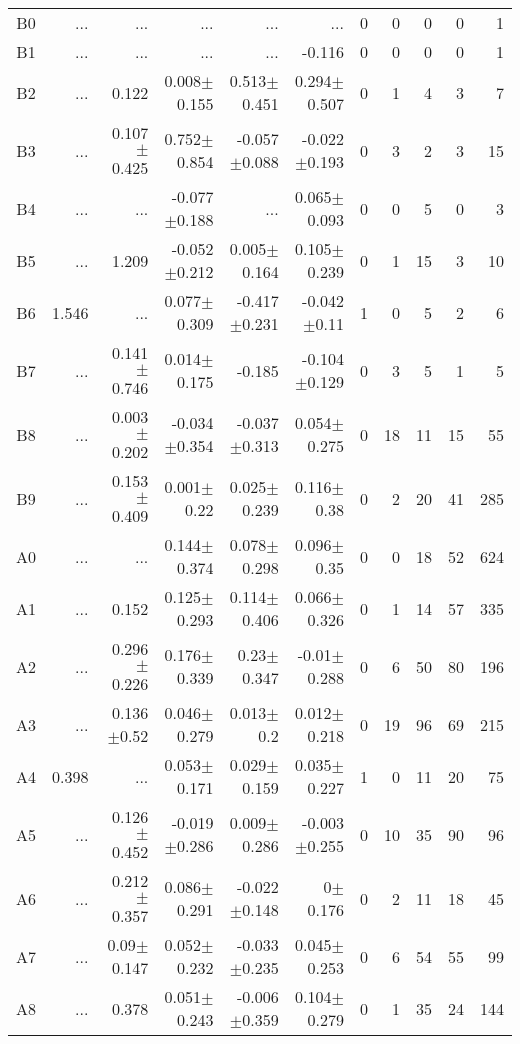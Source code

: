\begin{table}[t]
\begin{table}[t]
\begin{center}
\begin{tabular}{c|rrrrr|rrrrr}
    B0	&	 ...	&	 ...	&	 ...	&	 ...	&	 ...	&	0	&	0	&	0	&	0	&	1	\\
    B1	&	 ...	&	 ...	&	 ...	&	 ...	&	-0.116	&	0	&	0	&	0	&	0	&	1	\\
    B2	&	 ...	&	0.122	&	0.008$\pm$0.155	&	0.513$\pm$0.451	&	0.294$\pm$0.507	&	0	&	1	&	4	&	3	&	7	\\
    B3	&	 ...	&	0.107$\pm$0.425	&	0.752$\pm$0.854	&	-0.057$\pm$0.088	&	-0.022$\pm$0.193	&	0	&	3	&	2	&	3	&	15	\\
    B4	&	 ...	&	 ...	&	-0.077$\pm$0.188	&	 ...	&	0.065$\pm$0.093	&	0	&	0	&	5	&	0	&	3	\\
    B5	&	 ...	&	1.209	&	-0.052$\pm$0.212	&	0.005$\pm$0.164	&	0.105$\pm$0.239	&	0	&	1	&	15	&	3	&	10	\\
    B6	&	1.546	&	 ...	&	0.077$\pm$0.309	&	-0.417$\pm$0.231	&	-0.042$\pm$0.11	&	1	&	0	&	5	&	2	&	6	\\
    B7	&	 ...	&	0.141$\pm$0.746	&	0.014$\pm$0.175	&	-0.185	&	-0.104$\pm$0.129	&	0	&	3	&	5	&	1	&	5	\\
    B8	&	 ...	&	0.003$\pm$0.202	&	-0.034$\pm$0.354	&	-0.037$\pm$0.313	&	0.054$\pm$0.275	&	0	&	18	&	11	&	15	&	55	\\
    B9	&	 ...	&	0.153$\pm$0.409	&	0.001$\pm$0.22	&	0.025$\pm$0.239	&	0.116$\pm$0.38	&	0	&	2	&	20	&	41	&	285	\\
    A0	&	 ...	&	 ...	&	0.144$\pm$0.374	&	0.078$\pm$0.298	&	0.096$\pm$0.35	&	0	&	0	&	18	&	52	&	624	\\
    A1	&	 ...	&	0.152	&	0.125$\pm$0.293	&	0.114$\pm$0.406	&	0.066$\pm$0.326	&	0	&	1	&	14	&	57	&	335	\\
    A2	&	 ...	&	0.296$\pm$0.226	&	0.176$\pm$0.339	&	0.23$\pm$0.347	&	-0.01$\pm$0.288	&	0	&	6	&	50	&	80	&	196	\\
    A3	&	 ...	&	0.136$\pm$0.52	&	0.046$\pm$0.279	&	0.013$\pm$0.2	&	0.012$\pm$0.218	&	0	&	19	&	96	&	69	&	215	\\
    A4	&	0.398	&	 ...	&	0.053$\pm$0.171	&	0.029$\pm$0.159	&	0.035$\pm$0.227	&	1	&	0	&	11	&	20	&	75	\\
    A5	&	 ...	&	0.126$\pm$0.452	&	-0.019$\pm$0.286	&	0.009$\pm$0.286	&	-0.003$\pm$0.255	&	0	&	10	&	35	&	90	&	96	\\
    A6	&	 ...	&	0.212$\pm$0.357	&	0.086$\pm$0.291	&	-0.022$\pm$0.148	&	0$\pm$0.176	&	0	&	2	&	11	&	18	&	45	\\
    A7	&	 ...	&	0.09$\pm$0.147	&	0.052$\pm$0.232	&	-0.033$\pm$0.235	&	0.045$\pm$0.253	&	0	&	6	&	54	&	55	&	99	\\
    A8	&	 ...	&	0.378	&	0.051$\pm$0.243	&	-0.006$\pm$0.359	&	0.104$\pm$0.279	&	0	&	1	&	35	&	24	&	144	\\

\end{tabular}
\end{center}
\end{table}
\end{table}
